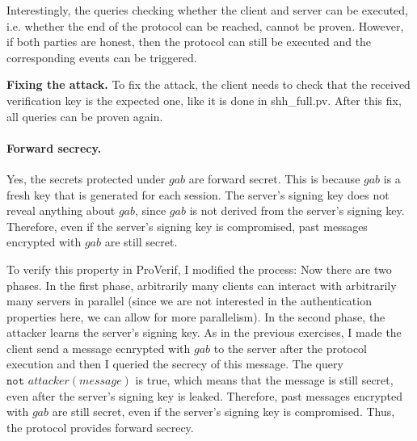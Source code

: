 \documentclass[12pt,a4paper]{article}
\begin{document}
Interestingly, the queries checking whether the client and server can be executed, i.e. whether the end of the protocol 
can be reached, cannot be proven. However, if both parties are honest, then the protocol can still be executed and the 
corresponding events can be triggered.

\textbf{Fixing the attack.}
To fix the attack, the client needs to check that the received verification key is the expected one, like it is done in 
shh\_full.pv. After this fix, all queries can be proven again.

\paragraph{Forward secrecy.}

Yes, the secrets protected under $gab$ are forward secret. This is because $gab$ is a fresh key that is generated for 
each session. The server's signing key does not reveal anything about $gab$, since $gab$ is not derived from the server's 
signing key. Therefore, even if the server's signing key is compromised, past messages encrypted with $gab$ are still secret.

To verify this property in ProVerif, I modified the process: Now there are two phases. In the first phase, arbitrarily 
many clients can interact with arbitrarily many servers in parallel (since we are not interested in the authentication 
properties here, we can allow for more parallelism). In the second phase, the attacker learns the server's signing key.
As in the previous exercises, I made the client send a message ecnrypted with $gab$ to the server after the protocol 
execution and then I queried the secrecy of this message. The query $\texttt{not } attacker(message)$ is true, which 
means that the message is still secret, even after the server's signing key is leaked. Therefore, past messages encrypted 
with $gab$ are still secret, even if the server's signing key is compromised. Thus, the protocol provides forward 
secrecy.
\end{document}
